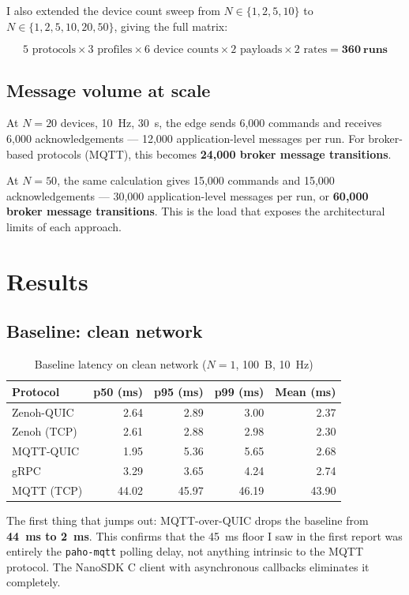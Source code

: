 \documentclass[11pt,a4paper]{article}
\begin{document}
I also extended the device count sweep from $N \in \{1, 2, 5, 10\}$ to $N \in \{1, 2, 5, 10, 20, 50\}$, giving the full matrix:

\[
5 \text{ protocols} \times 3 \text{ profiles} \times 6 \text{ device counts} \times 2 \text{ payloads} \times 2 \text{ rates} = \mathbf{360\ runs}
\]

\subsection*{Message volume at scale}

At $N=20$ devices, 10~Hz, 30~s, the edge sends 6,000 commands and receives 6,000 acknowledgements --- 12,000 application-level messages per run. For broker-based protocols (MQTT), this becomes \textbf{24,000 broker message transitions}.

At $N=50$, the same calculation gives 15,000 commands and 15,000 acknowledgements --- 30,000 application-level messages per run, or \textbf{60,000 broker message transitions}. This is the load that exposes the architectural limits of each approach.

\section{Results}

\subsection{Baseline: clean network}

\begin{table}[H]
\centering
\caption{Baseline latency on clean network ($N=1$, 100~B, 10~Hz)}
\label{tab:clean}
\begin{tabular}{lrrrr}
\toprule
Protocol & p50 (ms) & p95 (ms) & p99 (ms) & Mean (ms) \\
\midrule
Zenoh-QUIC  & 2.64 & 2.89 & 3.00 & 2.37 \\
Zenoh (TCP) & 2.61 & 2.88 & 2.98 & 2.30 \\
MQTT-QUIC   & 1.95 & 5.36 & 5.65 & 2.68 \\
gRPC        & 3.29 & 3.65 & 4.24 & 2.74 \\
MQTT (TCP)  & 44.02 & 45.97 & 46.19 & 43.90 \\
\bottomrule
\end{tabular}
\end{table}

The first thing that jumps out: MQTT-over-QUIC drops the baseline from \textbf{44~ms to 2~ms}. This confirms that the 45~ms floor I saw in the first report was entirely the \texttt{paho-mqtt} polling delay, not anything intrinsic to the MQTT protocol. The NanoSDK C client with asynchronous callbacks eliminates it completely.
\end{document}
